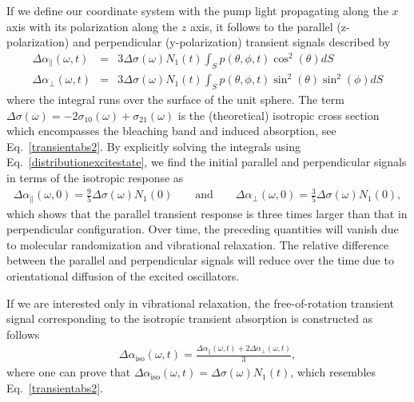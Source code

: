 If we define our coordinate system with the pump light propagating along the $x$ axis with its polarization along the $z$ axis, it follows to the parallel (z-polarization) and perpendicular (y-polarization) transient signals described by
\begin{eqnarray}
\Delta \alpha_\parallel (\omega, t) &=& 3 \Delta\sigma (\omega) N_1 (t) \int_S p(\theta,\phi,t) \cos^2 (\theta) dS \\
\Delta \alpha_\perp (\omega, t) &=& 3 \Delta\sigma (\omega) N_1(t) \int_S p(\theta,\phi,t) \sin^2 (\theta) \sin^2 (\phi) dS
\end{eqnarray}
where the integral runs over the surface of the unit sphere. The term $\Delta\sigma (\omega) = -2 \sigma_{10}(\omega) + \sigma_{21}(\omega) $ is the (theoretical) isotropic cross section which encompasses the bleaching band and induced absorption, see Eq.\ \ref{transientabs2}. By explicitly solving the integrals using Eq.\ \ref{distributionexcitestate}, we find the initial parallel and perpendicular signals in terms of the isotropic response as
\begin{eqnarray}
\Delta \alpha_\parallel (\omega, 0) = \frac{9}{5} \Delta\sigma (\omega) N_1 (0) \qquad \text{and} \qquad \Delta \alpha_\perp (\omega, 0) = \frac{3}{5} \Delta\sigma (\omega) N_1 (0),
\end{eqnarray}
which shows that the parallel transient response is three times larger than that in perpendicular configuration. Over time, the preceding quantities will vanish due to molecular randomization and vibrational relaxation. The relative difference between the parallel and perpendicular signals will reduce over the time due to orientational diffusion of the excited oscillators.

If we are interested only in vibrational relaxation, the free-of-rotation transient signal corresponding to the isotropic transient absorption is constructed as follows
\begin{eqnarray}
\Delta \alpha_\text{iso} (\omega, t) = \frac{\Delta \alpha_\parallel (\omega, t) + 2 \Delta \alpha_\perp (\omega, t)}{3},
\label{isotropicsignal}
\end{eqnarray}
where one can prove that $\Delta \alpha_\text{iso} (\omega, t) = \Delta\sigma (\omega) N_1 (t)$, which resembles Eq.\ \ref{transientabs2}.

